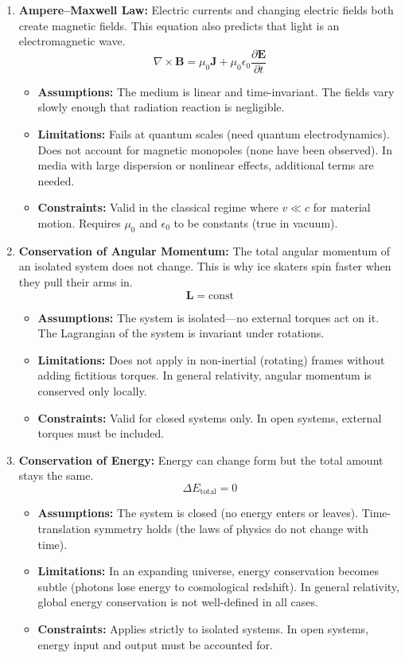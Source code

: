 \begin{enumerate}

\item \textbf{Ampere--Maxwell Law:} Electric currents and changing electric fields both create magnetic fields. This equation also predicts that light is an electromagnetic wave.
\[
\nabla\times\mathbf B=\mu_0\mathbf J+\mu_0\epsilon_0\frac{\partial\mathbf E}{\partial t}
\]
\begin{itemize}
\item \textbf{Assumptions:} The medium is linear and time-invariant. The fields vary slowly enough that radiation reaction is negligible.
\item \textbf{Limitations:} Fails at quantum scales (need quantum electrodynamics). Does not account for magnetic monopoles (none have been observed). In media with large dispersion or nonlinear effects, additional terms are needed.
\item \textbf{Constraints:} Valid in the classical regime where $v\ll c$ for material motion. Requires $\mu_0$ and $\epsilon_0$ to be constants (true in vacuum).
\end{itemize}

\item \textbf{Conservation of Angular Momentum:} The total angular momentum of an isolated system does not change. This is why ice skaters spin faster when they pull their arms in.
\[
\mathbf L=\text{const}
\]
\begin{itemize}
\item \textbf{Assumptions:} The system is isolated---no external torques act on it. The Lagrangian of the system is invariant under rotations.
\item \textbf{Limitations:} Does not apply in non-inertial (rotating) frames without adding fictitious torques. In general relativity, angular momentum is conserved only locally.
\item \textbf{Constraints:} Valid for closed systems only. In open systems, external torques must be included.
\end{itemize}

\item \textbf{Conservation of Energy:} Energy can change form but the total amount stays the same.
\[
\Delta E_{\text{total}}=0
\]
\begin{itemize}
\item \textbf{Assumptions:} The system is closed (no energy enters or leaves). Time-translation symmetry holds (the laws of physics do not change with time).
\item \textbf{Limitations:} In an expanding universe, energy conservation becomes subtle (photons lose energy to cosmological redshift). In general relativity, global energy conservation is not well-defined in all cases.
\item \textbf{Constraints:} Applies strictly to isolated systems. In open systems, energy input and output must be accounted for.
\end{itemize}


\end{enumerate}
